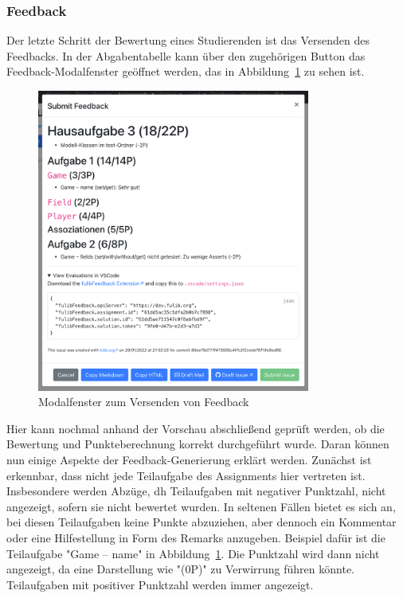 \subsubsection{Feedback}

Der letzte Schritt der Bewertung eines Studierenden ist das Versenden des Feedbacks.
In der Abgabentabelle kann über den zugehörigen Button das Feedback-Modalfenster geöffnet werden, das in Abbildung~\ref{fig:submit-feedback} zu sehen ist.

\begin{figure}
    \centering
    \includegraphics[width=0.8\textwidth]{images/submit-feedback}
    \caption{Modalfenster zum Versenden von Feedback}
    \label{fig:submit-feedback}
\end{figure}

Hier kann nochmal anhand der Vorschau abschließend geprüft werden, ob die Bewertung und Punkteberechnung korrekt durchgeführt wurde.
Daran können nun einige Aspekte der Feedback-Generierung erklärt werden.
Zunächst ist erkennbar, dass nicht jede Teilaufgabe des Assignments hier vertreten ist.
Insbesondere werden Abzüge, \ac{dh} Teilaufgaben mit negativer Punktzahl, nicht angezeigt, sofern sie nicht bewertet wurden.
In seltenen Fällen bietet es sich an, bei diesen Teilaufgaben keine Punkte abzuziehen, aber dennoch ein Kommentar oder eine Hilfestellung in Form des Remarks anzugeben.
Beispiel dafür ist die Teilaufgabe "Game -- name" in Abbildung~\ref{fig:submit-feedback}.
Die Punktzahl wird dann nicht angezeigt, da eine Darstellung wie "(0P)" zu Verwirrung führen könnte.
Teilaufgaben mit positiver Punktzahl werden immer angezeigt.

